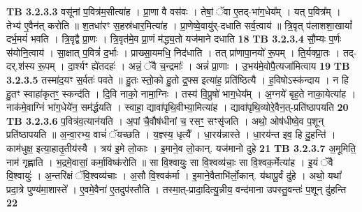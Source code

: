 \documentclass[17pt]{extarticle}
\begin{document}
{{{{{{{{{{{{{{{{{{{                  \newline
                                \textbf{ TB 3.2.3.3} \newline
                  वसू॑नां प॒वित्र॑म॒सीत्या॑ह । प्रा॒णा वै वस॑वः । तेषां॒ ॅवा ए॒तद्-भा॑ग॒धेय᳚म् । यत् प॒वित्र᳚म् । तेभ्य॑ ए॒वैन॑त् करोति ॥ श॒तधा॑रꣳ स॒हस्र॑धार॒मित्या॑ह । प्रा॒णेष्वे॒वायु॑र्-दधाति सर्व॒त्वाय॑ ॥ त्रि॒वृत् प॑लाशशा॒खायां᳚ दर्भ॒मयं॑ भवति । त्रि॒वृद्वै प्रा॒णः । त्रि॒वृत॑मे॒व प्रा॒णं म॑द्ध्य॒तो यज॑माने दधाति \textbf{ 18} \newline
                  \newline
                                \textbf{ TB 3.2.3.4} \newline
                  सौ॒म्यः प॒र्णः स॑योनि॒त्वाय॑ । सा॒क्षात् प॒वित्रं॑ द॒र्भाः । प्राख्सा॒यमधि॒ निद॑धाति । तत् प्रा॑णापा॒नयो॑ रू॒पम् । ति॒र्यक्प्रा॒तः । तद्-दर्.श॑स्य रू॒पम् । दा॒र्श्यꣳ ह्ये॑तदहः॑ । अन्नं॒ ॅवै च॒न्द्रमाः᳚ । अन्नं॑ प्रा॒णाः । उ॒भय॑मे॒वोपै॒त्यजा॑मित्वाय \textbf{ 19} \newline
                  \newline
                                \textbf{ TB 3.2.3.5} \newline
                  तस्मा॑द॒यꣳ स॒र्वतः॑ पवते ॥ हु॒तः स्तो॒को हु॒तो द्र॒फ्स इत्या॑ह॒ प्रति॑ष्ठित्यै । ह॒विषोऽस्क॑न्दाय । न हि हु॒तꣳ स्वाहा॑कृतꣳ॒॒ स्कन्द॑ति । दि॒वि नाको॒ नामा॒ग्निः । तस्य॑ वि॒प्रुषो॑ भाग॒धेय᳚म् । अ॒ग्नये॑ बृह॒ते नाका॒येत्या॑ह । नाक॑मे॒वाग्निं भा॑ग॒धेये॑न॒ सम॑र्द्धयति । स्वाहा॒ द्यावा॑पृथि॒वीभ्या॒मित्या॑ह । द्यावा॑पृथि॒व्योरे॒वैन॒त्-प्रति॑ष्ठापयति \textbf{ 20} \newline
                  \newline
                                \textbf{ TB 3.2.3.6} \newline
                  प॒वित्र॑व॒त्यान॑यति । अ॒पां चै॒वौष॑धीनां च॒ रसꣳ॒॒ सꣳसृ॑जति । अथो॒ ओष॑धीष्वे॒व प॒शून् प्रति॑ष्ठापयति ॥ अ॒न्वा॒रभ्य॒ वाचं॑ ॅयच्छति । य॒ज्ञ्स्य॒ धृत्यै᳚ । धा॒रय॑न्नास्ते । धा॒रय॑न्त इव॒ हि दु॒हन्ति॑ । काम॑धुक्ष॒ इत्या॒हातृ॒तीय॑स्यै । त्रय॑ इ॒मे लो॒काः । इ॒माने॒व लो॒कान्. यज॑मानो दुहे \textbf{ 21} \newline
                  \newline
                                \textbf{ TB 3.2.3.7} \newline
                  अ॒मूमिति॒ नाम॑ गृह्णाति । भ॒द्रमे॒वासां॒ कर्मा॒विष्क॑रोति ॥ सा वि॒श्वायुः॒ सा वि॒श्वव्य॑चाः॒ सा वि॒श्वक॒र्मेत्या॑ह । इ॒यं ॅवै वि॒श्वायुः॑ । अ॒न्तरि॑क्षं ॅवि॒श्वव्य॑चाः । अ॒सौ वि॒श्वक॑र्मा । इ॒माने॒वैताभि॑र्लो॒कान्. य॑थापू॒र्वं दु॑हे । अथो॒ यथा᳚ प्रदा॒त्रे पुण्य॑मा॒शास्ते᳚ । ए॒वमे॒वैना॑ ए॒तदुप॑स्तौति । तस्मा॒त्-प्रादा॒दित्यु॒न्नीय॒ वन्द॑माना उपस्तु॒वन्तः॑ प॒शून् दु॑हन्ति \textbf{ 22} \newline
}}}}}}}}}}}}}}}}}}}
\end{document}
